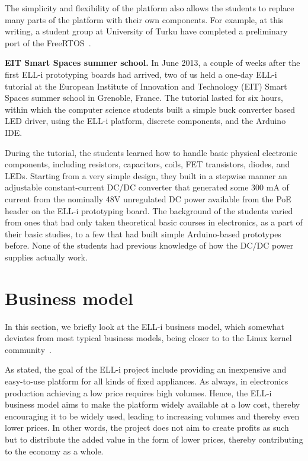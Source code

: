 \documentclass{siamltex}
\begin{document}
The simplicity and flexibility of the platform also allows the
students to replace many parts of the platform with their own
components.  For example, at this writing, a student group at
University of Turku have completed a preliminary port of the
FreeRTOS~\cite{barry2008freertos}.

{\bf EIT Smart Spaces summer school.}
In June 2013, a couple of weeks after the first ELL-i prototyping
boards had arrived, two of us held a one-day ELL-i tutorial at the
European Institute of Innovation and Technology (EIT) Smart Spaces
summer school in Grenoble, France.  The tutorial lasted for six hours,
within which the computer science students built a simple buck
converter based LED driver, using the ELL-i platform, discrete
components, and the Arduino IDE.

During the tutorial, the students learned how to handle basic physical
electronic components, including resistors, capacitors, coils, FET
transistors, diodes, and LEDs.  Starting from a very simple design,
they built in a stepwise manner an adjustable constant-current DC/DC
converter that generated some 300 mA of current from the nominally 48V
unregulated DC power available from the PoE header on the ELL-i
prototyping board.  The background of the students varied from ones
that had only taken theoretical basic courses in electronics, as a
part of their basic studies, to a few that had built simple
Arduino-based prototypes before.  None of the students had previous
knowledge of how the DC/DC power supplies actually work.


\section{Business model}
\label{sec:business}

In this section, we briefly look at the ELL-i business model, which somewhat
deviates from most typical business models, being closer to to the Linux kernel
community~\cite{hertel2003motivation, lee2003firm}.

As stated, the goal of the ELL-i project include providing an
inexpensive and easy-to-use platform for all kinds of fixed
appliances.  As always, in electronics production achieving a low
price requires high volumes.  Hence, the ELL-i business model aims to
make the platform widely available at a low cost, thereby encouraging
it to be widely used, leading to increasing volumes and thereby even
lower prices.  In other words, the project does not aim to
create profits as such but to distribute the added value in the form
of lower prices, thereby contributing to the economy as a whole.
\end{document}
